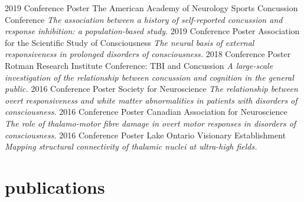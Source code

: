 \documentclass[]{k-cv} %
\begin{document}
\begin{entrylist}
\entry
{2019}
{Conference Poster}
{The American Academy of Neurology Sports Concussion Conference}
{\emph{The association between a history of self-reported concussion and response inhibition: a population-based study.}}
\entry
{2019}
{Conference Poster}
{Association for the Scientific Study of Consciousness}
{\emph{The neural basis of external responsiveness in prolonged disorders of consciousness.}}
\entry
{2018}
{Conference Poster}
{Rotman Research Institute Conference: TBI and Concussion}
{\emph{A large-scale investigation of the relationship between concussion and cognition in the general public.}}
\entry
{2016}
{Conference Poster}
{Society for Neuroscience}
{\emph{The relationship between overt responsiveness and white matter abnormalities in patients with disorders of consciousness.}}
\entry
{2016}
{Conference Poster}
{Canadian Association for Neuroscience}
{\emph{The role of thalamo-motor fibre damage in overt motor responses in disorders of consciousness.}}
\entry
{2016}
{Conference Poster}
{Lake Ontario Visionary Establishment}
{\emph{Mapping structural connectivity of thalamic nuclei at ultra-high fields.}}
\end{entrylist}


\section{publications}
\\


\end{document}
